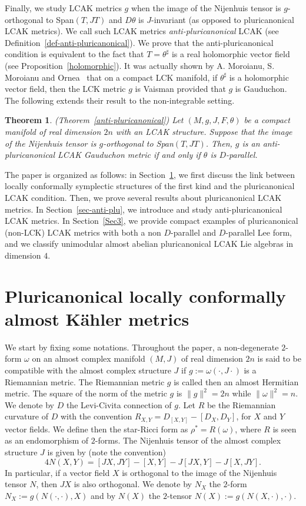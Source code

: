 \documentclass[a4paper,11pt]{amsart}
\newtheorem*{thm*}{Theorem}
\theoremstyle{definition}
\renewcommand{\[}{\begin{equation*}}
\renewcommand{\]}{\end{equation*}}
\begin{document}
Finally, we study LCAK metrics $g$ when the image of the Nijenhuis tensor is $g$-orthogonal to Span$(T,JT)$ and $D\theta$ is $J$-invariant (as opposed to pluricanonical LCAK metrics). We call such LCAK metrics {\it anti-pluricanonical} LCAK (see Definition~\ref{def-anti-pluricanonical}). We prove that the anti-pluricanonical condition is equivalent to the fact that $T=\theta^\sharp$ is a real holomorphic vector field (see Proposition~\ref{holomorphic}). It was actually shown by A. Moroianu, S. Moroianu and Ornea~\cite{MR3830777} that on a compact LCK manifold, if $\theta^\sharp$ is a holomorphic vector field, then the LCK metric $g$ is Vaisman provided that $g$ is Gauduchon. The following extends their result to the non-integrable setting. 

 \begin{thm*}(Theorem~\ref{anti-pluricanonical})
Let $(M, g, J, F, \theta)$ be a compact manifold of real dimension $2n$ with an LCAK structure.
 Suppose that the image of the Nijenhuis tensor is $g$-orthogonal to Span$(T,JT)$.
 Then, $g$ is an anti-pluricanonical LCAK Gauduchon metric if and only if $\theta$ is $D$-parallel.
 \end{thm*}

The paper is organized as follows: in Section~\ref{Sec1}, we first discuss the link between locally conformally symplectic structures of the first kind and the pluricanonical LCAK condition. Then, we prove several results about pluricanonical LCAK metrics. In Section~\ref{sec-anti-plu}, we introduce and study anti-pluricanonical LCAK metrics.
In Section~\ref{Sec3}, we provide compact examples of pluricanonical (non-LCK) LCAK metrics with both a non $D$-parallel and $D$-parallel Lee form, and we classify unimodular almost abelian pluricanonical LCAK Lie algebras in dimension $4.$ 

 
  \section{Pluricanonical locally conformally almost K\"ahler metrics}\label{Sec1}

We start by fixing some notations. Throughout the paper, a non-degenerate $2$-form $\omega$ on an almost complex manifold $(M,J)$ of real dimension $2n$ is said to be compatible with the almost complex structure $J$ if $g:=\omega(\cdot,J\cdot)$ is a Riemannian metric. The Riemannian metric $g$ is called then an almost Hermitian metric. The square of the norm of the metric $g$ is $\|g\|^2=2n$ while $\|\omega\|^{2}=n.$ We denote by $D$ the Levi-Civita connection of $g$. Let $R$ be the Riemannian curvature of $D$ with the convention $R_{X,Y}=D_{[X,Y]}-[D_X,D_Y]$, for $X$ and $Y$ vector fields. We define then the star-Ricci form as $\rho^\ast=R(\omega)$, where $R$ is seen as an endomorphism of $2$-forms. The Nijenhuis tensor of the almost complex structure $J$ is given by (note the convention)
$$4N(X,Y)=[JX,JY]-[X,Y]-J[JX,Y]-J[X,JY].$$ In particular, if a vector field $X$ is orthogonal to the image of the Nijenhuis tensor $N$, then $JX$ is also orthogonal. We denote by $N_X$ the $2$-form $N_X:=g(N(\cdot,\cdot),X)$ and by $N(X)$ the $2$-tensor $N(X):=g(N(X,\cdot),\cdot).$ 
\end{document}
